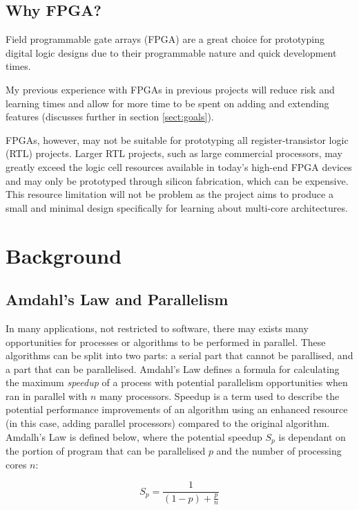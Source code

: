 \documentclass[11pt,a4paper]{report}
\begin{document}
{\section{Why FPGA?}
Field programmable gate arrays (FPGA) are a great choice for prototyping digital logic designs due to their programmable nature and quick development times. 

My previous experience with FPGAs in previous projects will reduce risk and learning times and allow for more time to be spent on adding and extending features (discusses further in section \ref{sect:goals}).

FPGAs, however, may not be suitable for prototyping all register-transistor logic (RTL) projects. Larger RTL projects, such as large commercial processors, may greatly exceed the logic cell resources available in today's high-end FPGA devices and may only be prototyped through silicon fabrication, which can be expensive. This resource limitation will not be problem as the project aims to produce a small and minimal design specifically for learning about multi-core architectures.

\chapter{Background}
{%
\startcontents[chapters]
}

\section{Amdahl's Law and Parallelism}
In many applications, not restricted to software, there may exists many opportunities for processes or algorithms to be performed in parallel. These algorithms can be split into two parts: a serial part that cannot be parallised, and a part that can be parallelised. Amdahl's Law defines a formula for calculating the maximum \textit{speedup} of a process with potential parallelism opportunities when ran in parallel with $n$ many processors. Speedup is a term used to describe the potential performance improvements of an algorithm using an enhanced resource (in this case, adding parallel processors) compared to the original algorithm. Amdalh's Law is defined below, where the potential speedup $S_p$ is dependant on the portion of program that can be parallelised $p$ and the number of processing cores $n$:

\begin{equation}
S_{p} = \frac{1}{(1-p)+\frac{p}{n}}
\label{eq:amdahl}
\end{equation}

}
\end{document}
